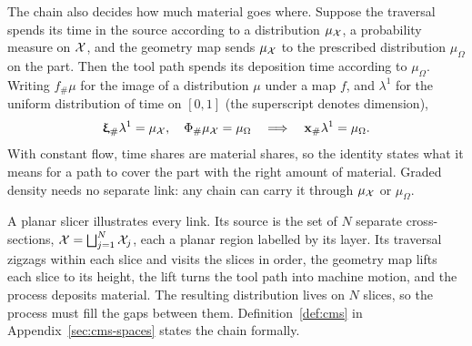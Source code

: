 The chain also decides how much material goes where. Suppose the traversal spends its time in the source according to a distribution $\mu_{\mathcal{X}}$, a probability measure on $\mathcal{X}$, and the geometry map sends $\mu_{\mathcal{X}}$ to the prescribed distribution $\mu_\Omega$ on the part. Then the tool path spends its deposition time according to $\mu_\Omega$. Writing $f_\#\mu$ for the image of a distribution $\mu$ under a map $f$, and $\lambda^1$ for the uniform distribution of time on $[0,1]$ (the superscript denotes dimension),
\begin{equation}
  \label{eq:main-measure}
  {\bm{\mathrm{\upxi}}}_\#\lambda^1=\mu_{\mathcal{X}},\quad \Phi_\#\mu_{\mathcal{X}}=\mu_\Omega
  \quad\Longrightarrow\quad
  {\bm{\mathrm{x}}}_\#\lambda^1=\mu_\Omega .
\end{equation}
With constant flow, time shares are material shares, so the identity states what it means for a path to cover the part with the right amount of material. Graded density needs no separate link: any chain can carry it through $\mu_{\mathcal{X}}$ or $\mu_\Omega$.

A planar slicer illustrates every link. Its source is the set of $N$ separate cross-sections, $\mathcal{X}=\bigsqcup_{j=1}^N\mathcal{X}_j$, each a planar region labelled by its layer. Its traversal zigzags within each slice and visits the slices in order, the geometry map lifts each slice to its height, the lift turns the tool path into machine motion, and the process deposits material. The resulting distribution lives on $N$ slices, so the process must fill the gaps between them. Definition~\ref{def:cms} in Appendix~\ref{sec:cms-spaces} states the chain formally.

